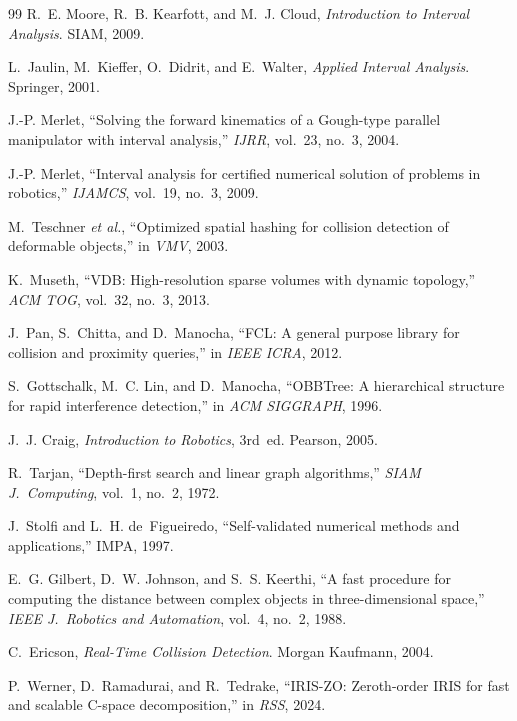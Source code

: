 \documentclass[journal]{IEEEtran}
\begin{document}
\begin{thebibliography}{99}
R.~E. Moore, R.~B. Kearfott, and M.~J. Cloud, \emph{Introduction to Interval Analysis}. SIAM, 2009.

L.~Jaulin, M.~Kieffer, O.~Didrit, and E.~Walter, \emph{Applied Interval Analysis}. Springer, 2001.

J.-P. Merlet, ``Solving the forward kinematics of a Gough-type parallel manipulator with interval analysis,'' \emph{IJRR}, vol.~23, no.~3, 2004.

J.-P. Merlet, ``Interval analysis for certified numerical solution of problems in robotics,'' \emph{IJAMCS}, vol.~19, no.~3, 2009.

M.~Teschner \textit{et al.}, ``Optimized spatial hashing for collision detection of deformable objects,'' in \emph{VMV}, 2003.

K.~Museth, ``VDB: High-resolution sparse volumes with dynamic topology,'' \emph{ACM TOG}, vol.~32, no.~3, 2013.

J.~Pan, S.~Chitta, and D.~Manocha, ``FCL: A general purpose library for collision and proximity queries,'' in \emph{IEEE ICRA}, 2012.

S.~Gottschalk, M.~C. Lin, and D.~Manocha, ``OBBTree: A hierarchical structure for rapid interference detection,'' in \emph{ACM SIGGRAPH}, 1996.

J.~J. Craig, \emph{Introduction to Robotics}, 3rd~ed. Pearson, 2005.

R.~Tarjan, ``Depth-first search and linear graph algorithms,'' \emph{SIAM J.\ Computing}, vol.~1, no.~2, 1972.

J.~Stolfi and L.~H. de~Figueiredo, ``Self-validated numerical methods and applications,'' IMPA, 1997.

E.~G. Gilbert, D.~W. Johnson, and S.~S. Keerthi, ``A fast procedure for computing the distance between complex objects in three-dimensional space,'' \emph{IEEE J.\ Robotics and Automation}, vol.~4, no.~2, 1988.

C.~Ericson, \emph{Real-Time Collision Detection}. Morgan Kaufmann, 2004.

P.~Werner, D.~Ramadurai, and R.~Tedrake, ``IRIS-ZO: Zeroth-order IRIS for fast and scalable C-space decomposition,'' in \emph{RSS}, 2024.


\end{thebibliography}
\end{document}

